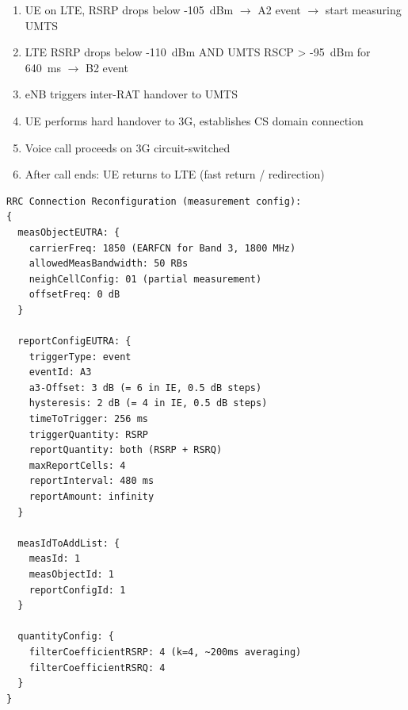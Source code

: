 \begin{enumerate}
\def\labelenumi{\arabic{enumi}.}
\tightlist
\item
  UE on LTE, RSRP drops below -105~dBm \ensuremath{\to} A2 event \ensuremath{\to} start measuring UMTS
\item
  LTE RSRP drops below -110~dBm AND UMTS RSCP \textgreater{} -95~dBm for 640~ms \ensuremath{\to} B2 event
\item
  eNB triggers inter-RAT handover to UMTS
\item
  UE performs hard handover to 3G, establishes CS domain connection
\item
  Voice call proceeds on 3G circuit-switched
\item
  After call ends: UE returns to LTE (fast return /\allowbreak{} redirection)
\end{enumerate}



\CNchained{}

\def\CNcodelang{}

\begin{CNplaincode}
\begin{Verbatim}
RRC Connection Reconfiguration (measurement config):
{
  measObjectEUTRA: {
    carrierFreq: 1850 (EARFCN for Band 3, 1800 MHz)
    allowedMeasBandwidth: 50 RBs
    neighCellConfig: 01 (partial measurement)
    offsetFreq: 0 dB
  }
  
  reportConfigEUTRA: {
    triggerType: event
    eventId: A3
    a3-Offset: 3 dB (= 6 in IE, 0.5 dB steps)
    hysteresis: 2 dB (= 4 in IE, 0.5 dB steps)
    timeToTrigger: 256 ms
    triggerQuantity: RSRP
    reportQuantity: both (RSRP + RSRQ)
    maxReportCells: 4
    reportInterval: 480 ms
    reportAmount: infinity
  }
  
  measIdToAddList: {
    measId: 1
    measObjectId: 1
    reportConfigId: 1
  }
  
  quantityConfig: {
    filterCoefficientRSRP: 4 (k=4, ~200ms averaging)
    filterCoefficientRSRQ: 4
  }
}
\end{Verbatim}
\end{CNplaincode}



